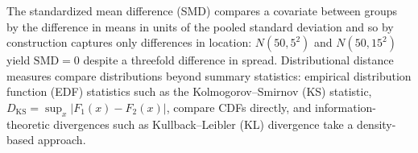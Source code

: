 \documentclass[AMA,Times1COL]{WileyNJDv5}
\begin{document}
The standardized mean difference (SMD) compares a covariate between groups by the difference in means in units of the pooled standard deviation\cite{austin2011} and so by construction captures only differences in location: $N(50, 5^2)$ and $N(50, 15^2)$ yield $\text{SMD} = 0$ despite a threefold difference in spread. Distributional distance measures compare distributions beyond summary statistics: empirical distribution function (EDF) statistics such as the Kolmogorov--Smirnov (KS) statistic, $D_{\text{KS}} = \sup_x |F_1(x) - F_2(x)|$, compare CDFs directly, and information-theoretic divergences such as Kullback--Leibler (KL) divergence take a density-based approach.
\end{document}
